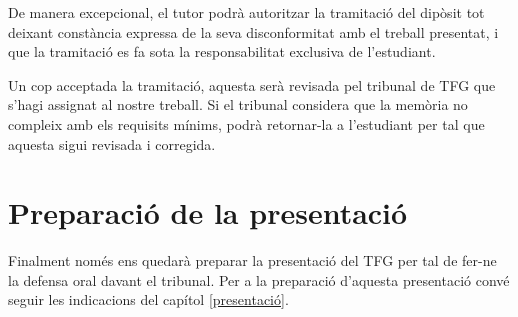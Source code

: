 De manera excepcional, el tutor podrà autoritzar la tramitació del dipòsit tot deixant constància expressa de la seva disconformitat amb el treball presentat, i que la tramitació es fa sota la responsabilitat exclusiva de l’estudiant. 

Un cop acceptada la tramitació, aquesta serà revisada pel tribunal de \ac{TFG} que s'hagi assignat al nostre treball. Si el tribunal considera que la memòria no compleix amb els requisits mínims, podrà retornar-la a l'estudiant per tal que aquesta sigui revisada i corregida. 



\section{Preparació de la presentació}

Finalment només ens quedarà preparar la presentació del \ac{TFG} per tal de fer-ne la defensa oral davant el tribunal. Per a la preparació d'aquesta presentació convé seguir les indicacions del capítol \ref{presentació}.
